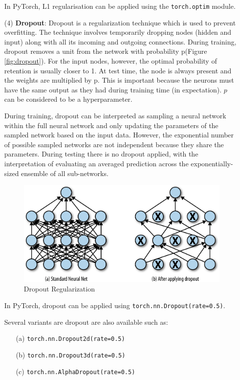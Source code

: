 \begin{itemize}
    In PyTorch, L1 regularisation can be applied using the \texttt{torch.optim} module.
    
    \item[(4)] \textbf{Dropout}: Dropout is a regularization technique which is used to prevent overfitting. The technique involves temporarily dropping nodes (hidden and input) along with all its incoming and outgoing connections. During training, dropout removes a unit from the network with probability p(Figure \ref{fig:dropout}). For the input nodes, however, the optimal probability of retention is usually closer to 1. At test time, the node is always present and the weights are multiplied by p.
    This is important because the neurons must have the same output as they had during training time (in expectation).
    $p$ can be considered to be a hyperparameter.

    During training, dropout can be interpreted as sampling a neural network within the full neural network and only updating the parameters of the sampled network based on the input data.
    However, the exponential number of possible sampled networks are not independent because they share the parameters.
    During testing there is no dropout applied, with the interpretation of evaluating an averaged prediction across the exponentially-sized ensemble of all sub-networks.
    
    \begin{figure}
        \centering
        \includegraphics[scale=0.65]{labs/08/images/dropout.png}
        \caption{Dropout Regularization}
        \label{fig:Dropout Regularization}
    \end{figure}
        
    In PyTorch, dropout can be applied using \texttt{torch.nn.Dropout(rate=0.5)}.
    
    Several variants are dropout are also available such as:
    \begin{itemize}
        \item[(a)] \texttt{torch.nn.Dropout2d(rate=0.5)}
        \item[(b)] \texttt{torch.nn.Dropout3d(rate=0.5)}
        \item[(c)] \texttt{torch.nn.AlphaDropout(rate=0.5)}
    \end{itemize}
    

\end{itemize}
